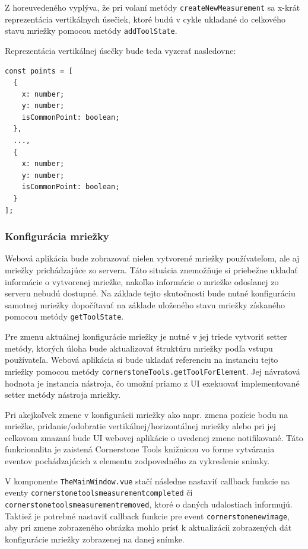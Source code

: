 Z horeuvedeného vyplýva, že pri volaní metódy \texttt{createNewMeasurement} sa x-krát reprezentácia vertikálnych úsečiek, ktoré budú v cykle ukladané do celkového stavu mriežky pomocou metódy \texttt{addToolState}.

Reprezentácia vertikálnej úsečky bude teda vyzerať nasledovne:
\begin{verbatim}
const points = [
  {
    x: number;
    y: number;
    isCommonPoint: boolean;
  },
  ...,
  {
    x: number;
    y: number;
    isCommonPoint: boolean;
  }
];
\end{verbatim}

\subsubsection {Konfigurácia mriežky}
Webová aplikácia bude zobrazovať nielen vytvorené mriežky používateľom, ale aj mriežky prichádzajúce zo servera. Táto situácia znemožňuje si priebežne ukladať informácie o vytvorenej mriežke, nakoľko informácie o mriežke odoslanej zo serveru nebudú dostupné. Na základe tejto skutočnosti bude nutné konfiguráciu samotnej mriežky dopočítavať na základe uloženého stavu mriežky získaného pomocou metódy \texttt{getToolState}.

Pre zmenu aktuálnej konfigurácie mriežky je nutné v jej triede vytvoriť setter metódy, ktorých úloha bude aktualizovať štruktúru mriežky podľa vstupu používateľa. Webová aplikácia si bude ukladať referenciu na instanciu tejto mriežky pomocou metódy \texttt{cornerstoneTools.getToolForElement}. Jej návratová hodnota je instancia nástroja, čo umožní priamo z UI exekuovať implementované setter metódy nástroja mriežky.

Pri akejkoľvek zmene v konfigurácii mriežky ako napr. zmena pozície bodu na mriežke, pridanie/odobratie vertikálnej/horizontálnej mriežky alebo pri jej celkovom zmazaní bude UI webovej aplikácie o uvedenej zmene notifikované. Táto funkcionalita je zaistená Cornerstone Tools knižnicou vo forme vytvárania eventov pochádzajúcich z elementu zodpovedného za vykreslenie snímky.

V komponente \texttt{TheMainWindow.vue} stačí následne nastaviť callback funkcie na eventy \texttt{cornerstonetoolsmeasurementcompleted} či \texttt{cornerstonetoolsmeasurementremoved}, ktoré o daných udalostiach informujú. Taktiež je potrebné nastaviť callback funkcie pre event \texttt{cornerstonenewimage}, aby pri zmene zobrazeného obrázka mohlo prísť k aktualizácii zobrazených dát konfigurácie mriežky zobrazenej na danej snímke.

